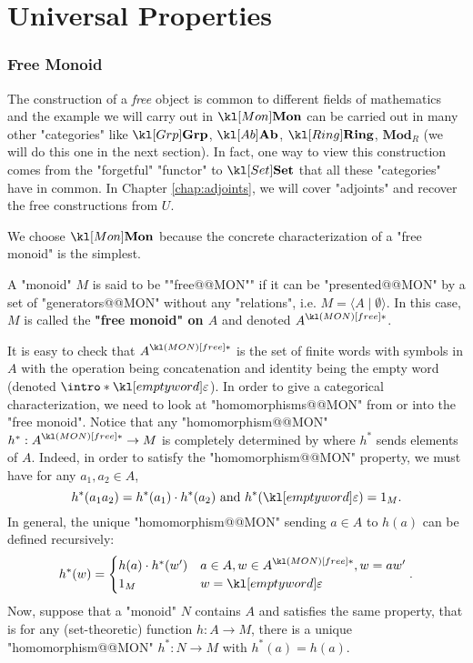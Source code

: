 \documentclass[main.tex]{subfiles}
\begin{document}
\chapter{Universal Properties}\label{chap:universal}
\subsection{Free Monoid}
The construction of a \textit{free} object is common to different fields of mathematics and the example we will carry out in $\catMon$ can be carried out in many other "categories" like $\catGrp$, $\catAb$, $\catRing$, $\textbf{Mod}_R$ (we will do this one in the next section). In fact, one way to view this construction comes from the "forgetful" "functor" to $\catSet$ that all these "categories" have in common. In Chapter \ref{chap:adjoints}, we will cover "adjoints" and recover the free constructions from $U$.

We choose $\catMon$ because the concrete characterization of a "free monoid" is the simplest.
\begin{defn}[Classical]
    \AP A "monoid" $M$ is said to be ""free@@MON"" if it can be "presented@@MON" by a set of "generators@@MON" without any "relations", i.e. $M = \langle A \mid \emptyset \rangle$. In this case, $M$ is called the \textbf{"free monoid" on $A$} and denoted $\freemon{A}$.
\end{defn}
It is easy to check that $\freemon{A}$ is the set of finite words with symbols in $A$ with the operation being concatenation and identity being \AP the empty word (denoted $\intro*\emptyword$). In order to give a categorical characterization, we need to look at "homomorphisms@@MON" from or into the "free monoid". Notice that any "homomorphism@@MON" $h^*:\freemon{A} \rightarrow M$ is completely determined by where $h^*$ sends elements of $A$. Indeed, in order to satisfy the "homomorphism@@MON" property, we must have for any $a_1, a_2 \in A$, \[h^*(a_1a_2) = h^*(a_1)\cdot h^*(a_2) \text{ and } h^*(\emptyword) = 1_M.\] In general, the unique "homomorphism@@MON" sending $a \in A$ to $h(a)$ can be defined recursively:
\[h^*(w) = \begin{cases}
    h(a)\cdot h^*(w') &a \in A, w \in \freemon{A}, w = aw'\\
    1_M &w = \emptyword\end{cases}.\]
Now, suppose that a "monoid" $N$ contains $A$ and satisfies the same property, that is for any (set-theoretic) function $h:A \rightarrow M$, there is a unique "homomorphism@@MON" $h^*:N \rightarrow M$ with $h^*(a) = h(a)$. 
\end{document}

